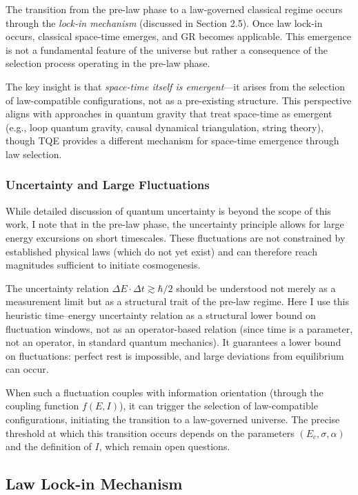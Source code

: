 \documentclass[12pt,a4paper]{article}
\theoremstyle{definition}
\theoremstyle{remark}
\begin{document}
The transition from the pre-law phase to a law-governed classical regime occurs through the \emph{lock-in mechanism} (discussed in Section 2.5). Once law lock-in occurs, classical space-time emerges, and GR becomes applicable. This emergence is not a fundamental feature of the universe but rather a consequence of the selection process operating in the pre-law phase.

The key insight is that \emph{space-time itself is emergent}—it arises from the selection of law-compatible configurations, not as a pre-existing structure. This perspective aligns with approaches in quantum gravity that treat space-time as emergent (e.g., loop quantum gravity, causal dynamical triangulation, string theory), though TQE provides a different mechanism for space-time emergence through law selection.

\subsubsection{Uncertainty and Large Fluctuations}

While detailed discussion of quantum uncertainty is beyond the scope of this work, I note that in the pre-law phase, the uncertainty principle allows for large energy excursions on short timescales. These fluctuations are not constrained by established physical laws (which do not yet exist) and can therefore reach magnitudes sufficient to initiate cosmogenesis.

The uncertainty relation $\Delta E \cdot \Delta t \gtrsim \hbar/2$ should be understood not merely as a measurement limit but as a structural trait of the pre-law regime. Here I use this heuristic time--energy uncertainty relation as a structural lower bound on fluctuation windows, not as an operator-based relation (since time is a parameter, not an operator, in standard quantum mechanics). It guarantees a lower bound on fluctuations: perfect rest is impossible, and large deviations from equilibrium can occur.

When such a fluctuation couples with information orientation (through the coupling function $f(E,I)$), it can trigger the selection of law-compatible configurations, initiating the transition to a law-governed universe. The precise threshold at which this transition occurs depends on the parameters $(E_c, \sigma, \alpha)$ and the definition of $I$, which remain open questions.

\subsection{Law Lock-in Mechanism}
\end{document}

